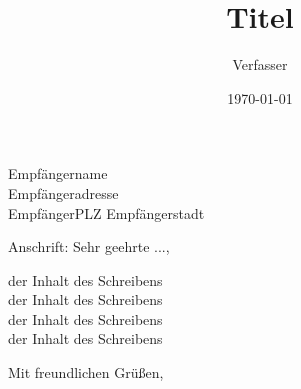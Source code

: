 \documentclass[foldmarks=on,fromalign=right,backaddress=true,fromemail=false,fromurl=false,fromlogo=false,fromphone=true]{scrlttr2}
\title{Titel}
\author{Verfasser}
\date{\today}
\begin{document}
	\begin{letter}{Empfängername\\Empfängeradresse\\EmpfängerPLZ Empfängerstadt}
		\opening{Anschrift: Sehr geehrte ...,}

			der Inhalt des Schreibens\\
			der Inhalt des Schreibens\\
			der Inhalt des Schreibens\\
			der Inhalt des Schreibens

		\closing{Mit freundlichen Grüßen,}
	\end{letter}
\end{document}
